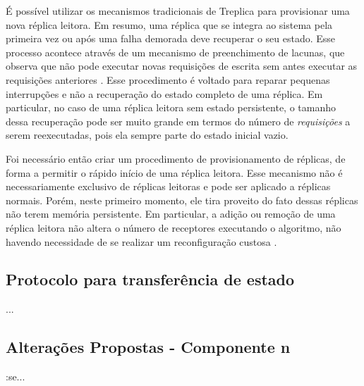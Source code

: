 É possível utilizar os mecanismos tradicionais de Treplica para provisionar uma nova
réplica leitora. Em resumo, uma réplica que se integra ao sistema pela primeira vez ou
após uma falha demorada deve recuperar o seu estado. Esse processo acontece através de um
mecanismo de preenchimento de lacunas, que observa que não pode executar novas requisições
de escrita sem antes executar as requisições anteriores \cite{vieira-tr10b}. Esse
procedimento é voltado para reparar pequenas interrupções e não a recuperação do estado
completo de uma réplica. Em particular, no caso de uma réplica leitora sem estado
persistente, o tamanho dessa recuperação pode ser muito grande em termos do número de
\emph{requisições} a serem reexecutadas, pois ela sempre parte do estado inicial vazio.

Foi necessário então criar um procedimento de provisionamento de réplicas, de forma a
permitir o rápido início de uma réplica leitora. Esse mecanismo não é necessariamente
exclusivo de réplicas leitoras e pode ser aplicado a réplicas normais. Porém, neste
primeiro momento, ele tira proveito do fato dessas réplicas não terem memória persistente.
Em particular, a adição ou remoção de uma réplica leitora não altera o número de
receptores executando o algoritmo, não havendo necessidade de se realizar um
reconfiguração custosa \cite{lamport10}.

\subsection{Protocolo para transferência de estado}
...


\subsection{Alterações Propostas - Componente n}

:se...
